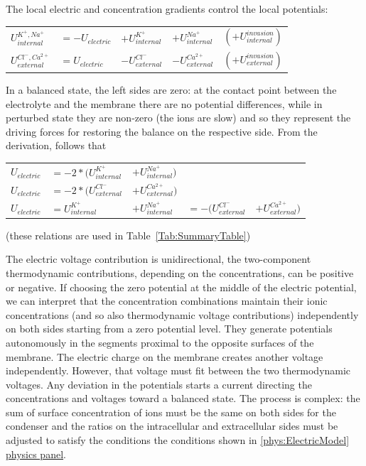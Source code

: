 {
The local electric and concentration gradients control the local potentials:

\begin{tabular}{lllll}
$U_{internal}^{K^+,Na^+}$  & $= -U_{electric}$ & $+ U_{internal}^{K^+} $ & $+ U_{internal}^{Na^+}$ & $(+U_{internal}^{invasion})$\\
$U_{external}^{Cl^-,Ca^{2+}} $&$= U_{electric} $&$- U_{external}^{Cl^-}$ &$- U_{external}^{Ca^{2+}}$&$(+U_{external}^{invasion})$
\end{tabular}

In a balanced state, the left sides are zero: at the contact point between the electrolyte and the membrane
there are no potential differences, while in perturbed state they are non-zero (the ions are slow) and so they represent the driving forces for restoring the balance on the respective side. 
From the derivation, follows that

\begin{tabular}{lllll}
	$U_{electric}$ &$= - 2*(U_{internal}^{K^+} $&$+ U_{internal}^{Na^+}) $\\
	$U_{electric}$ &$= - 2*(U_{external}^{Cl^-} $&$+ U_{external}^{Ca^{2+}})$ \\
	$U_{electric}$ &$=  U_{internal}^{K^+} $&$+ U_{internal}^{Na^+}$ 
	&$= - (U_{external}^{Cl^-} $&$+ U_{external}^{Ca^{2+}})$	
\end{tabular}
(these relations are used in Table~\ref{Tab:SummaryTable})
}

\else

The electric voltage contribution is unidirectional, the two-component thermodynamic contributions, depending on the concentrations, can be positive or negative.
If choosing the zero potential at the middle of the electric potential, we can interpret that
the concentration combinations maintain their ionic concentrations (and so also thermodynamic voltage contributions) independently on both sides starting from a zero potential level. They generate potentials autonomously in the segments proximal to the opposite surfaces of the membrane. The electric charge on the membrane creates another voltage independently. However, that voltage must fit between the two thermodynamic voltages. Any deviation in the potentials starts a current directing the concentrations and voltages toward a balanced state.
The process is complex: the sum of surface concentration of ions must be the same on both sides for the condenser and the ratios on the intracellular and extracellular sides must be adjusted to satisfy the conditions the conditions shown in {\hyperlink{phys:ElectricModel}{\ref{phys:ElectricModel} physics panel}}.

